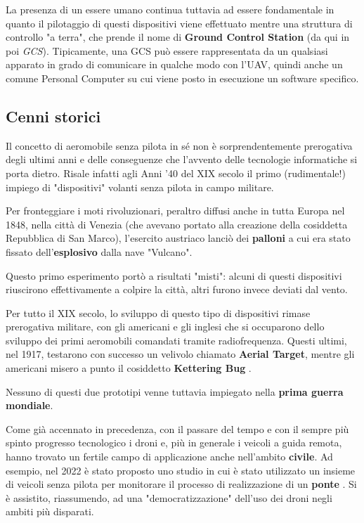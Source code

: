 \documentclass[a4paper, 12pt, oneside]{article}
\theoremstyle{definition}
\begin{document}
La presenza di un essere umano continua tuttavia ad essere fondamentale in quanto il pilotaggio di questi dispositivi viene effettuato mentre una struttura di controllo "a terra", che prende il nome di \textbf{Ground Control Station} (da qui in poi \textit{GCS}). Tipicamente, una GCS può essere rappresentata da un qualsiasi apparato in grado di comunicare in qualche modo con l'UAV, quindi anche un comune Personal Computer su cui viene posto in esecuzione un software specifico.

\subsection{Cenni storici}
Il concetto di aeromobile senza pilota in sé non è sorprendentemente prerogativa degli ultimi anni e delle conseguenze che l'avvento delle tecnologie informatiche si porta dietro. Risale infatti agli Anni '40 del XIX secolo il primo (rudimentale!) impiego di "dispositivi" volanti senza pilota in campo militare. 

Per fronteggiare i moti rivoluzionari, peraltro diffusi anche in tutta Europa nel 1848, nella città di Venezia (che avevano portato alla creazione della cosiddetta Repubblica di San Marco), l'esercito austriaco lanciò dei \textbf{palloni} a cui era stato fissato dell'\textbf{esplosivo} dalla nave "Vulcano". 

Questo primo esperimento portò a risultati "misti": alcuni di questi dispositivi riuscirono effettivamente a colpire la città, altri furono invece deviati dal vento.

Per tutto il XIX secolo, lo sviluppo di questo tipo di dispositivi rimase prerogativa militare, con gli americani e gli inglesi che si occuparono dello sviluppo dei primi aeromobili comandati tramite radiofrequenza. Questi ultimi, nel 1917, testarono con successo un velivolo chiamato \textbf{Aerial Target}, mentre gli americani misero a punto il cosiddetto \textbf{Kettering Bug} \cite{drones-history}.

Nessuno di questi due prototipi venne tuttavia impiegato nella \textbf{prima guerra mondiale}.

Come già accennato in precedenza, con il passare del tempo e con il sempre più spinto progresso tecnologico i droni e, più in generale i veicoli a guida remota, hanno trovato un fertile campo di applicazione anche nell'ambito \textbf{civile}. Ad esempio, nel 2022 è stato proposto uno studio in cui è stato utilizzato un insieme di veicoli senza pilota per monitorare il processo di realizzazione di un \textbf{ponte} \cite{rs14081858}.
Si è assistito, riassumendo, ad una "democratizzazione" dell'uso dei droni negli ambiti più disparati.
\end{document}
